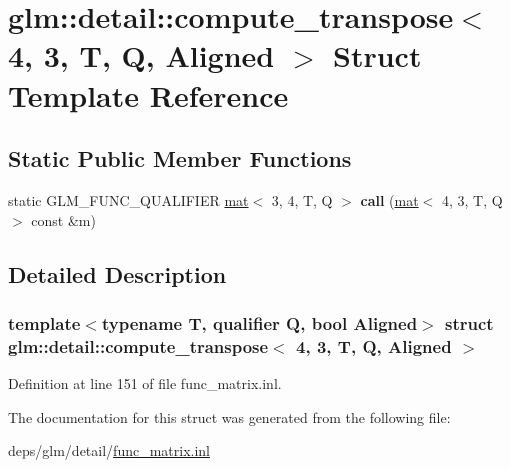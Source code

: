\hypertarget{structglm_1_1detail_1_1compute__transpose_3_014_00_013_00_01T_00_01Q_00_01Aligned_01_4}{}\section{glm\+:\+:detail\+:\+:compute\+\_\+transpose$<$ 4, 3, T, Q, Aligned $>$ Struct Template Reference}
\label{structglm_1_1detail_1_1compute__transpose_3_014_00_013_00_01T_00_01Q_00_01Aligned_01_4}
\subsection*{Static Public Member Functions}
\begin{DoxyCompactItemize}
\item 
\mbox{\label{structglm_1_1detail_1_1compute__transpose_3_014_00_013_00_01T_00_01Q_00_01Aligned_01_4_a11dcaea9624ba8b9509df70883e0256a}} 
static G\+L\+M\+\_\+\+F\+U\+N\+C\+\_\+\+Q\+U\+A\+L\+I\+F\+I\+ER \hyperlink{structglm_1_1mat}{mat}$<$ 3, 4, T, Q $>$ {\bfseries call} (\hyperlink{structglm_1_1mat}{mat}$<$ 4, 3, T, Q $>$ const \&m)
\end{DoxyCompactItemize}


\subsection{Detailed Description}
\subsubsection*{template$<$typename T, qualifier Q, bool Aligned$>$\newline
struct glm\+::detail\+::compute\+\_\+transpose$<$ 4, 3, T, Q, Aligned $>$}



Definition at line 151 of file func\+\_\+matrix.\+inl.



The documentation for this struct was generated from the following file\+:\begin{DoxyCompactItemize}
\item 
deps/glm/detail/\hyperlink{func__matrix_8inl}{func\+\_\+matrix.\+inl}\end{DoxyCompactItemize}
